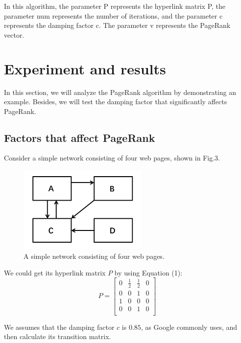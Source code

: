 \documentclass[lettersize,journal,12pt,conference]{IEEEtran}
\begin{document}
In this algorithm, the parameter P represents the hyperlink matrix P, the parameter num represents the number of iterations, and the parameter c represents the damping factor c. The parameter v represents the PageRank vector.

\section{Experiment and results}

In this section, we will analyze the PageRank algorithm by demonstrating an example. Besides, we will test the damping factor that significantly affects PageRank.

\subsection{Factors that affect PageRank}

Consider a simple network consisting of four web pages, shown in Fig.3.

\begin{figure}[h]
	\centering
	\includegraphics[width=2.5in]{images/fig5.png}
	\caption{A simple network consisting of four web pages.}
	\label{fig4}
\end{figure}

We could get its hyperlink matrix $P$ by using Equation (1):
\begin{equation}
	\label{eq:12}
	P = \begin{bmatrix}
		0 & \frac{1}{2} & \frac{1}{2} & 0 \\
		0 & 0           & 1           & 0 \\
		1 & 0           & 0           & 0 \\
		0 & 0           & 1           & 0 \\
	\end{bmatrix}
\end{equation}

We assumes that the damping factor $c$ is $0.85$, as Google commonly uses, and then calculate its transition matrix.
\end{document}
